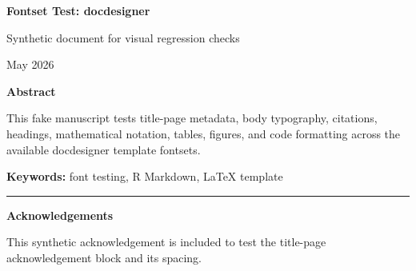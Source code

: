 \documentclass[12pt]{article}
\newif\ifdocdesigneranon
\begin{document}
\begin{titlepage}
\thispagestyle{empty}

\vspace*{0.14\textheight}
\begin{center}


{\LARGE\bfseries Fontset Test: docdesigner\par}

\vspace{0.25em}
{\large Synthetic document for visual regression checks\par}

\vspace{2em}

\begin{singlespace}
{\normalsize

\docdesignerauthorblock

\par\vspace{2\baselineskip}
\docdesignerseriesblock

\ifdocdesigneranon\else
\vspace{0.5em}
{\small May 2026}\par
\fi

}
\end{singlespace}


\vspace{2em}

\begin{minipage}{0.8\textwidth}
\small\singlespacing
\textbf{Abstract}\par\vspace{0.25em}
This fake manuscript tests title-page metadata, body typography,
citations, headings, mathematical notation, tables, figures, and code
formatting across the available docdesigner template fontsets.
\par\vspace{1em}
\noindent\textbf{Keywords: }font testing, R Markdown, LaTeX template
\end{minipage}

\vfill

\ifdocdesigneranon\else
\begin{minipage}{0.8\textwidth}
\footnotesize\singlespacing
\noindent\rule{0.3\textwidth}{0.4pt}\par
\textbf{Acknowledgements}\par
This synthetic acknowledgement is included to test the title-page
acknowledgement block and its spacing.
\end{minipage}
\fi

\end{center}
\end{titlepage}
\fi\fi
\fi\fi
\end{document}
